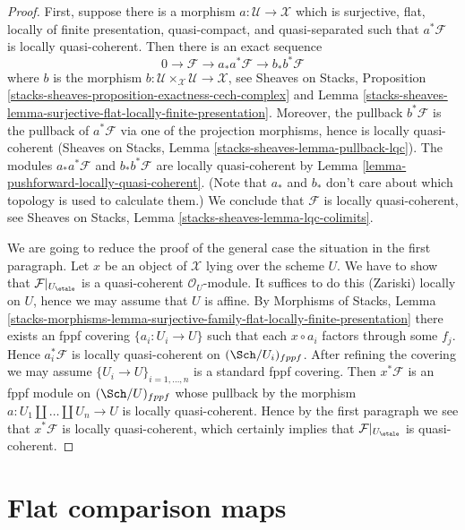 \begin{proof}
First, suppose there is a morphism $a : \mathcal{U} \to \mathcal{X}$
which is surjective, flat, locally of finite presentation, quasi-compact,
and quasi-separated such that $a^*\mathcal{F}$ is locally quasi-coherent.
Then there is an exact sequence
$$
0 \to \mathcal{F} \to a_*a^*\mathcal{F} \to b_*b^*\mathcal{F}
$$
where $b$ is the morphism
$b : \mathcal{U} \times_\mathcal{X} \mathcal{U} \to \mathcal{X}$, see
Sheaves on Stacks, Proposition
\ref{stacks-sheaves-proposition-exactness-cech-complex} and
Lemma \ref{stacks-sheaves-lemma-surjective-flat-locally-finite-presentation}.
Moreover, the pullback $b^*\mathcal{F}$ is the pullback of $a^*\mathcal{F}$
via one of the projection morphisms, hence is locally quasi-coherent
(Sheaves on Stacks, Lemma \ref{stacks-sheaves-lemma-pullback-lqc}).
The modules $a_*a^*\mathcal{F}$ and $b_*b^*\mathcal{F}$ are locally
quasi-coherent by Lemma \ref{lemma-pushforward-locally-quasi-coherent}.
(Note that $a_*$ and $b_*$ don't care about which topology is
used to calculate them.)
We conclude that $\mathcal{F}$ is locally quasi-coherent, see
Sheaves on Stacks, Lemma \ref{stacks-sheaves-lemma-lqc-colimits}.

\medskip\noindent
We are going to reduce the proof of the general case the
situation in the first paragraph. Let $x$ be an object of $\mathcal{X}$
lying over the scheme $U$. We have to show that
$\mathcal{F}|_{U_\etale}$ is a quasi-coherent $\mathcal{O}_U$-module.
It suffices to do this (Zariski) locally on $U$, hence we may
assume that $U$ is affine. By
Morphisms of Stacks, Lemma
\ref{stacks-morphisms-lemma-surjective-family-flat-locally-finite-presentation}
there exists an fppf covering $\{a_i : U_i \to U\}$ such that
each $x \circ a_i$ factors through some $f_j$. Hence $a_i^*\mathcal{F}$
is locally quasi-coherent on $(\Sch/U_i)_{fppf}$. After refining
the covering we may assume $\{U_i \to U\}_{i = 1, \ldots, n}$
is a standard fppf covering. Then $x^*\mathcal{F}$ is an fppf
module on $(\Sch/U)_{fppf}$ whose pullback by the morphism
$a : U_1 \amalg \ldots \amalg U_n \to U$ is locally quasi-coherent.
Hence by the first paragraph we see that $x^*\mathcal{F}$ is locally
quasi-coherent, which certainly implies that $\mathcal{F}|_{U_\etale}$
is quasi-coherent.
\end{proof}






\section{Flat comparison maps}
\label{section-flat-comparison}

